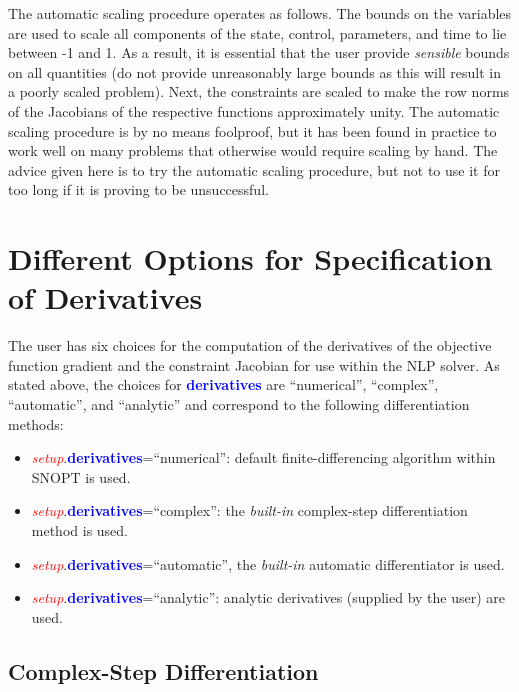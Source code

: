 \documentclass[10pt,final]{report}
\newcommand{\bfblue}[1]{\textcolor{blue}{\bf #1}}
\newcommand{\slred}[1]{\textcolor{red}{\sl #1}}
\begin{document}
The automatic scaling procedure operates as follows.  The bounds on the
variables are used to scale all components of the state, control, parameters,
and time to lie between -1 and 1.  As a result, it is essential that the user
provide {\em sensible} bounds on all quantities (\eg do not provide
unreasonably large bounds as this will result in a poorly scaled problem).
Next, the constraints are scaled to make the row norms of the Jacobians of the
respective functions approximately unity.  The automatic scaling procedure is
by no means foolproof, but it has been found in practice to work well on many
problems that otherwise would require scaling by hand.  The advice given here
is to try the automatic scaling procedure, but not to use it for too long if
it is proving to be unsuccessful.

\section{Different Options for Specification of Derivatives\label{sect:_derivatives}}

The user has six choices for the computation of the derivatives of
the objective function gradient and the constraint Jacobian for use
within the NLP solver.  As stated above, the choices for
\bfblue{derivatives} are ``numerical'', ``complex'', ``automatic'', and ``analytic'' and correspond to the following differentiation methods:
\begin{itemize}
\item \slred{setup}.\bfblue{derivatives}=``numerical'':  default
  finite-differencing algorithm within SNOPT is used.
\item \slred{setup}.\bfblue{derivatives}=``complex'': the {\em
    built-in} complex-step differentiation method is used.
\item \slred{setup}.\bfblue{derivatives}=``automatic'', the {\em
    built-in} automatic differentiator is used.
\item \slred{setup}.\bfblue{derivatives}=``analytic'': analytic derivatives
(supplied by the user) are used.
\end{itemize}

\subsection{Complex-Step Differentiation}
\end{document}
